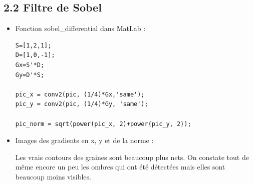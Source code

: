 \documentclass{article}
\begin{document}
\subsection*{2.2 Filtre de Sobel}

\begin{itemize}\renewcommand{\labelitemi}{$\bullet$}
	\item Fonction sobel\_differential dans MatLab :
	
\begin{lstlisting}
S=[1,2,1];
D=[1,0,-1];
Gx=S'*D;
Gy=D'*S;

pic_x = conv2(pic, (1/4)*Gx,'same');
pic_y = conv2(pic, (1/4)*Gy, 'same');

pic_norm = sqrt(power(pic_x, 2)+power(pic_y, 2));
\end{lstlisting}

	\item Images des gradients en x, y et de la norme :
	

Les vrais contours des graines sont beaucoup plus nets. On constate tout de même encore un peu les ombres qui ont été détectées mais elles sont beaucoup moins visibles.
\end{itemize}
\end{document}
